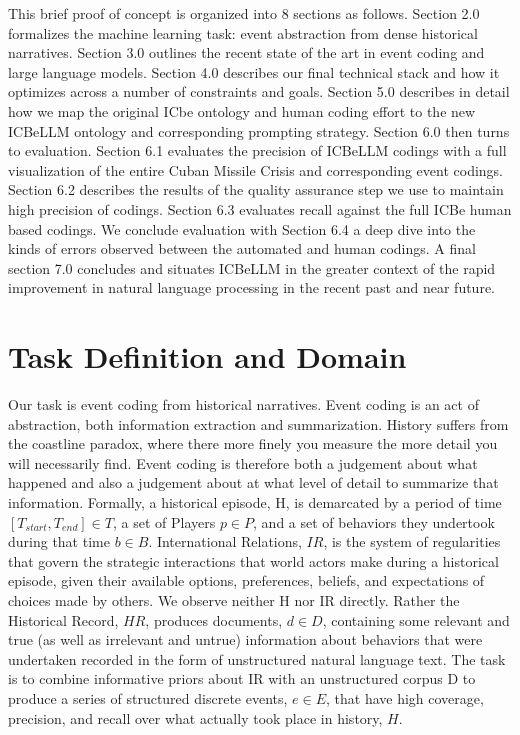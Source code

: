 \documentclass[
]{article}
\begin{document}
This brief proof of concept is organized into 8 sections as follows.
Section 2.0 formalizes the machine learning task: event abstraction from
dense historical narratives. Section 3.0 outlines the recent state of
the art in event coding and large language models. Section 4.0 describes
our final technical stack and how it optimizes across a number of
constraints and goals. Section 5.0 describes in detail how we map the
original ICbe ontology and human coding effort to the new ICBeLLM
ontology and corresponding prompting strategy. Section 6.0 then turns to
evaluation. Section 6.1 evaluates the precision of ICBeLLM codings with
a full visualization of the entire Cuban Missile Crisis and
corresponding event codings. Section 6.2 describes the results of the
quality assurance step we use to maintain high precision of codings.
Section 6.3 evaluates recall against the full ICBe human based codings.
We conclude evaluation with Section 6.4 a deep dive into the kinds of
errors observed between the automated and human codings. A final section
7.0 concludes and situates ICBeLLM in the greater context of the rapid
improvement in natural language processing in the recent past and near
future.

\section{Task Definition and Domain}\label{task-definition-and-domain}

Our task is event coding from historical narratives. Event coding is an
act of abstraction, both information extraction and summarization.
History suffers from the coastline paradox, where there more finely you
measure the more detail you will necessarily find. Event coding is
therefore both a judgement about what happened and also a judgement
about at what level of detail to summarize that information. Formally, a
historical episode, H, is demarcated by a period of time
\([T_{start}, T_{end}] ∈ T\), a set of Players \(p ∈ P\), and a set of
behaviors they undertook during that time \(b ∈ B\). International
Relations, \(IR\), is the system of regularities that govern the
strategic interactions that world actors make during a historical
episode, given their available options, preferences, beliefs, and
expectations of choices made by others. We observe neither H nor IR
directly. Rather the Historical Record, \(HR\), produces documents,
\(d ∈ D\), containing some relevant and true (as well as irrelevant and
untrue) information about behaviors that were undertaken recorded in the
form of unstructured natural language text. The task is to combine
informative priors about IR with an unstructured corpus D to produce a
series of structured discrete events, \(e ∈ E\), that have high
coverage, precision, and recall over what actually took place in
history, \(H\).
\end{document}
